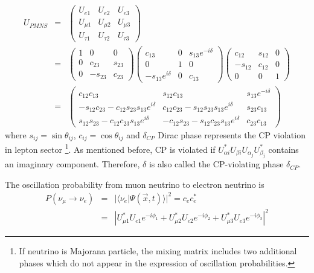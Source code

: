 \documentclass[a4 paper,12pt]{report}%
\begin{document}
 \begin{eqnarray}\label{eq:2}\nonumber
U_{PMNS} &=& \left(\begin{array}{ccc}U_{e1}& U_{e2} & U_{e3}\\U_{\mu 1} & U_{\mu 2} & U_{\mu 3}\\U_{\tau 1}& U_{\tau 2}& U_{\tau 3}\end{array}\right)\\  \nonumber 
&=& \left(\begin{array}{ccc} 1& 0 & 0 \\ 0 & c_{23} & s_{23}\\ 0& - s_{23}& c_{23}\end{array}\right) \left(\begin{array}{ccc} c_{13}& 0 & s_{13}e^{-i\delta}\\ 0 & 1&0 \\-s_{13}e^{i\delta}& 0 & c_{13} \end{array}\right) \left(\begin{array}{ccc}c_{12} & s_{12} & 0\\ -s_{12} & c_{12} & 0\\ 0 & 0 & 1\end{array}\right) \\ 
&=&  \left(\begin{array}{ccc}c_{12}c_{13}& s_{12}c_{13} & s_{13}e^{-i\delta}\\ -s_{12}c_{23} - c_{12}s_{23}s_{13}e^{i\delta} & c_{12}c_{23} - s_{12}s_{23}s_{13}e^{i\delta}& s_{23}c_{13}\\ s_{12}s_{23}-c_{12}c_{23}s_{13}e^{i\delta}& -c_{12}s_{23}-s_{12}c_{23}s_{13}e^{i\delta} & c_{23}c_{13}\end{array}\right)
\end{eqnarray}
where $s_{ij} = \sin{\theta_{ij}}$, $c_{ij} = \cos\theta_{ij}$ and $\delta_{CP}$ Dirac phase represents the CP violation in lepton sector \footnote{If neutrino is Majorana particle, the mixing matrix includes two additional phases which do not appear in the expression of oscillation probabilities.}.
As mentioned before, CP is violated if $U^*_{\alpha i}U_{\beta i}U_{\alpha_j}U^*_{\beta_j}$ contains an imaginary component. Therefore, $\delta$ is also called the CP-violating phase $\delta_{CP}$.  

The oscillation probability from muon neutrino to electron neutrino is
   \begin{eqnarray}\label{10}
P(\nu_\mu \rightarrow \nu_e) &=& |\langle \nu_e |\Psi(\vec x, t)\rangle|^2 = c_ec_e^*\nonumber \\
&=& |U^*_{\mu 1}U_{e1}e^{-i\phi_1}+U^*_{\mu 2}U_{e2}e^{-i\phi_2}+U^*_{\mu3}U_{e3}e^{-i\phi_3}|^2
   \end{eqnarray} \par
\end{document}
